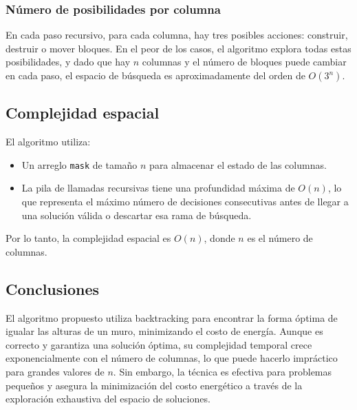 \documentclass[a4paper,12pt]{article}
\begin{document}
\subsubsection{Número de posibilidades por columna}
En cada paso recursivo, para cada columna, hay tres posibles acciones: construir, destruir o mover bloques. En el peor de los casos, el algoritmo explora todas estas posibilidades, y dado que hay \( n \) columnas y el número de bloques puede cambiar en cada paso, el espacio de búsqueda es aproximadamente del orden de \( O(3^n) \).

\subsection{Complejidad espacial}
El algoritmo utiliza:
\begin{itemize}
	\item Un arreglo \texttt{mask} de tamaño \( n \) para almacenar el estado de las columnas.
	\item La pila de llamadas recursivas tiene una profundidad máxima de \( O(n) \), lo que representa el máximo número de decisiones consecutivas antes de llegar a una solución válida o descartar esa rama de búsqueda.
\end{itemize}
Por lo tanto, la complejidad espacial es \( O(n) \), donde \( n \) es el número de columnas.

\subsection{Conclusiones}
El algoritmo propuesto utiliza backtracking para encontrar la forma óptima de igualar las alturas de un muro, minimizando el costo de energía. Aunque es correcto y garantiza una solución óptima, su complejidad temporal crece exponencialmente con el número de columnas, lo que puede hacerlo impráctico para grandes valores de \( n \). Sin embargo, la técnica es efectiva para problemas pequeños y asegura la minimización del costo energético a través de la exploración exhaustiva del espacio de soluciones.
\end{document}
